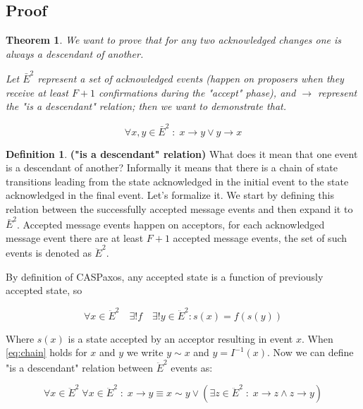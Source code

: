\documentclass[12pt]{article}
\newtheorem{theorem}{Theorem}
\theoremstyle{definition}
\newtheorem*{definition}{Definition}
\begin{document}
\begin{appendices}
\section{Proof}
\label{appendix:proof}

\begin{theorem} \label{th:proof}
  We want to prove that for any two acknowledged changes one is always a descendant of another.
  
  Let $\bar{E}^2$ represent a set of acknowledged events (happen on proposers when they receive at least $F+1$ confirmations during the "accept" phase), and $\to$ represent the "is a descendant" relation; then we want to demonstrate that.

  \begin{equation}
    \forall x,y \in \bar{E}^2 \;:\; x \to y \lor y \to x
  \end{equation}
\end{theorem}

\theoremstyle{definition}
\begin{definition}{\bf("is a descendant" relation)}
  What does it mean that one event is a descendant of another? Informally it means that there is a chain of state transitions leading from the state acknowledged in the initial event to the state acknowledged in the final event. Let's formalize it. We start by defining this relation between the successfully accepted message events and then expand it to $\bar{E}^2$. Accepted message events happen on acceptors, for each acknowledged message event there are at least $F+1$ accepted message events, the set of such events is denoted as $\ddot{E}^2$.

  By definition of CASPaxos, any accepted state is a function of previously accepted state, so
  
  \begin{equation} \label{eq:chain}
    \forall x \in \ddot{E}^2 \quad \exists ! f \quad \exists ! y \in \ddot{E}^2 : s(x) = f(s(y))
  \end{equation}
  
  Where $s(x)$ is a state accepted by an acceptor resulting in event $x$. When \ref{eq:chain} holds for $x$ and $y$ we write $y \sim x$ and $y = I^{-1}(x)$. Now we can define "is a descendant" relation between $\ddot{E}^2$ events as:
  
  \begin{equation}
    \forall x \in \ddot{E}^2 \; \forall x \in \ddot{E}^2 \;:\; x \to y \equiv x \sim y \lor (\exists z \in \ddot{E}^2 \;:\; x \to z \land z \to y)
  \end{equation}
  

\end{definition}
\end{appendices}
\end{document}
